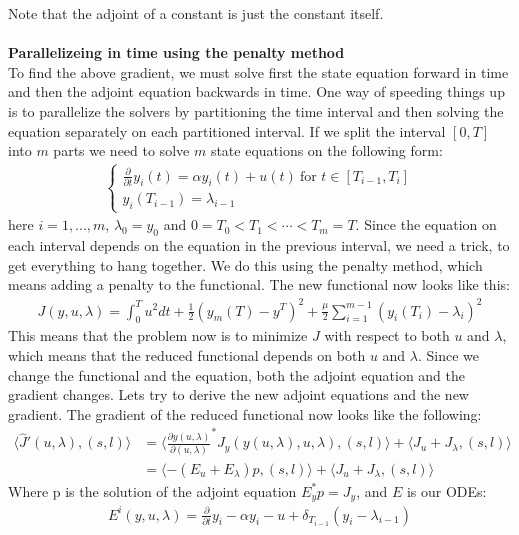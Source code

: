 \documentclass[11pt,a4paper]{report}
\begin{document}
Note that the adjoint of a constant is just the constant itself.
\\
\\
\textbf{Parallelizeing in time using the penalty method}
\\
To find the above gradient, we must solve first the state equation forward in time and then the adjoint equation backwards in time. One way of speeding things up is to parallelize the solvers by partitioning the time interval and then solving the equation separately on each partitioned interval. If we split the interval $[0,T]$ into $m$ parts we need to solve $m$ state equations on the following form:
\begin{align*}
   \left\{
     \begin{array}{lr}
       \frac{\partial }{\partial t} y_i(t) = \alpha y_i(t) + u(t) \ \text{for $t \in [T_{i-1},T_{i}]$}\\
	y_i(T_{i-1}) = \lambda_{i-1}
     \end{array}
   \right.
\end{align*}
here $i=1,...,m$, $\lambda_0=y_0$ and $0=T_0<T_1<\cdots<T_{m}=T$. Since the equation on each interval depends on the equation in the previous interval, we need a trick, to get everything to hang together. We do this using the penalty method, which means adding a penalty to the functional. The new functional now looks like this:
\begin{align*}
J(y,u,\lambda) = \int_0^T u^2 dt + \frac{1}{2}(y_m(T)-y^T)^2 + \frac{\mu}{2} \sum_{i=1}^{m-1} (y_{i}(T_i)-\lambda_i)^2 
\end{align*}
This means that the problem now is to minimize $J$ with respect to both $u$ and $\lambda$, which means that the reduced functional depends on both $u$ and $\lambda$. Since we change the functional and the equation, both the adjoint equation and the gradient changes. Lets try to derive the new adjoint equations and the new gradient. The gradient of the reduced functional now looks like the following:
\begin{align*}
\langle \hat{J}'(u,\lambda), (s,l)\rangle &= \langle \frac{\partial y(u,\lambda)}{\partial(u,\lambda)}^* J_y(y(u,\lambda),u,\lambda), (s,l)\rangle + \langle J_u+J_{\lambda}, (s,l)\rangle \\
&=\langle -(E_u+E_{\lambda})p , (s,l)\rangle + \langle J_u+J_{\lambda}, (s,l)\rangle
\end{align*} 
Where p is the solution of the adjoint equation $E_y^*p=J_y$, and $E$ is our ODEs:
\begin{align*}
E^i(y,u,\lambda)= \frac{\partial }{\partial t} y_i - \alpha y_i -u+ \delta_{T_{i-1}}(y_i-\lambda_{i-1})
\end{align*} 
\end{document}
